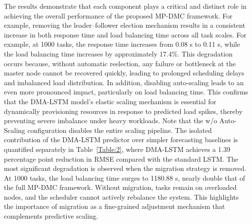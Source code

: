 \documentclass[twoside,twocolumn]{article}
\begin{document}
The results demonstrate that each component plays a critical and distinct role in achieving the overall performance of the proposed MP-DMC framework. For example, removing the leader--follower election mechanism results in a consistent increase in both response time and load balancing time across all task scales. For example, at 1000 tasks, the response time increases from 0.08 s to 0.11 s, while the load balancing time increases by approximately 17.4\%. This degradation occurs because, without automatic reelection, any failure or bottleneck at the master node cannot be recovered quickly, leading to prolonged scheduling delays and imbalanced load distribution. In addition, disabling auto-scaling leads to an even more pronounced impact, particularly on load balancing time. This confirms that the DMA-LSTM model's elastic scaling mechanism is essential for dynamically provisioning resources in response to predicted load spikes, thereby preventing severe imbalance under heavy workloads. Note that the w/o Auto-Scaling configuration disables the entire scaling pipeline. The isolated contribution of the DMA-LSTM predictor over simpler forecasting baselines is quantified separately in Table~\ref{Table:2}, where DMA-LSTM achieves a 1.39 percentage point reduction in RMSE compared with the standard LSTM. The most significant degradation is observed when the migration strategy is removed. At 1000 tasks, the load balancing time surges to 1180.88 s, nearly double that of the full MP-DMC framework. Without migration, tasks remain on overloaded nodes, and the scheduler cannot actively rebalance the system. This highlights the importance of migration as a fine-grained adjustment mechanism that complements predictive scaling.
\end{document}
